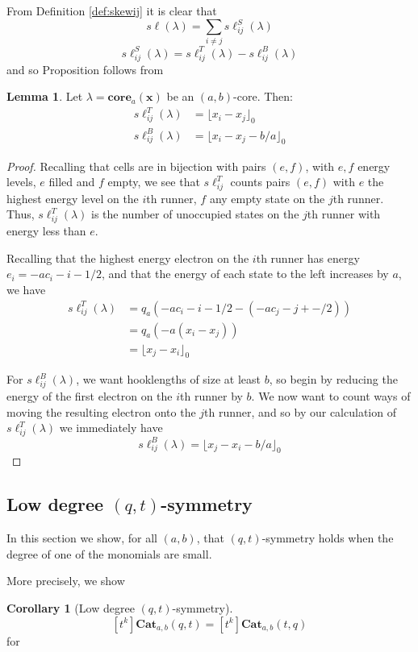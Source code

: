 \documentclass{amsart}[12pt]
\theoremstyle{definition}
\newtheorem{lemma}[dummy]{Lemma}
\newtheorem{corollary}[dummy]{Corollary}
\newcommand{\core}{\mathbf{core}}
\newcommand{\Cat}{\mathbf{Cat}}
\newcommand{\sk}{s\ell}
\begin{document}
From Definition \ref{def:skewij} it is clear that
$$\sk(\lambda)=\sum_{i\neq j}\sk^S_{ij}(\lambda)$$
$$\sk_{ij}^S(\lambda)=\sk_{ij}^T(\lambda)-\sk^B_{ij}(\lambda)$$
and so Proposition follows from

\begin{lemma}
Let $\lambda=\core_a(\mathbf{x})$ be an $(a,b)$-core.  Then:
\begin{align*}
\sk_{ij}^T(\lambda)&=\lfloor x_i-x_j\rfloor_0 \\
\sk_{ij}^B(\lambda)&=\lfloor x_i-x_j-b/a\rfloor_0
\end{align*}
\end{lemma}

\begin{proof}
Recalling that cells are in bijection with pairs $(e, f)$, with $e, f$ energy levels, $e$ filled and $f$ empty, we see that $\sk^T_{ij}$ counts pairs $(e, f)$ with $e$ the highest energy level on the $i$th runner, $f$ any empty state on the $j$th runner.  Thus, $\sk^T_{ij}(\lambda)$ is the number of unoccupied states on the $j$th runner with energy less than $e$.

Recalling that the highest energy electron on the $i$th runner has energy $e_i=-ac_i-i-1/2$, and that the energy of each state to the left increases by $a$, we have  
\begin{align*}
\sk_{ij}^T(\lambda)&=q_a\left(-ac_i-i-1/2-(-ac_j-j+-/2)\right) \\
&=q_a(-a(x_i-x_j)) \\
&=\lfloor x_j-x_i\rfloor_0
\end{align*}

For $\sk_{ij}^B(\lambda)$, we want hooklengths of size at least $b$, so begin by reducing the energy of the first electron on the $i$th runner by $b$.  We now want to count ways of moving the resulting electron onto the $j$th runner, and so by our calculation of $\sk_{ij}^T(\lambda)$ we immediately have
$$\sk_{ij}^B(\lambda)=\lfloor x_j-x_i-b/a\rfloor_0$$
\end{proof}




\subsection{Low degree \texorpdfstring{$(q,t)$}{(q,t)}-symmetry}
In this section we show, for all $(a,b)$, that $(q,t)$-symmetry holds when the degree of one of the monomials are small.  


More precisely, we show
\begin{corollary}[Low degree $(q,t)$-symmetry]
$$[t^k]\Cat_{a,b}(q,t)=[t^k]\Cat_{a,b}(t,q)$$
for 

\end{corollary}
\end{document}
